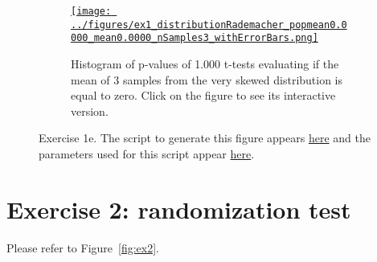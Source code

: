 \documentclass{article}
\def\fig_width{3.5in}
\begin{document}
\begin{enumerate}[(a)]
\begin{figure}[H]
\begin{center}
\begin{subfigure}{1.0\textwidth}
                    \label{fig:ex1e_1}
                \end{subfigure}

                \begin{subfigure}{1.0\textwidth}
                    \centering
                    \href{https://www.gatsby.ucl.ac.uk/~rapela/neuroinformatics/2023/ws1/figures/ex1_distributionRademacher_popmean0.0000_mean0.0000_nSamples3_withErrorBars.html}{\texttt{[image: ../figures/ex1\_distributionRademacher\_popmean0.0000\_mean0.0000\_nSamples3\_withErrorBars.png]}}

                    \caption{Histogram of p-values of 1.000 t-tests evaluating if the mean
                    of 3 samples from the very skewed distribution is equal to zero.
                    Click on the figure to see its interactive version.}

                    \label{fig:ex1e_2}
                \end{subfigure}

                \caption{Exercise 1e.
                The script to generate this figure appears
                \href{https://github.com/joacorapela/neuroinformatics23/blob/master/worksheets/ws1/mySolution/code/scripts/doEx1WithErrorBars.py}{here} and the
                parameters used for this script appear
                \href{https://github.com/joacorapela/neuroinformatics23/blob/master/worksheets/ws1/mySolution/code/scripts/doEx1eWithErrorBars.csh}{here}.}
                \label{fig:ex1e}

            \end{center}
        \end{figure}

\end{enumerate}

\section*{Exercise 2: randomization test}

Please refer to Figure~\ref{fig:ex2}.
\end{document}
